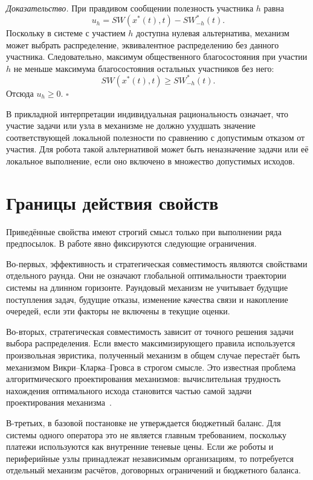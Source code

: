 \textit{Доказательство.}
При правдивом сообщении полезность участника $h$ равна
\[
u_h=SW(x^*(t),t)-SW^*_{-h}(t).
\]
Поскольку в системе с участием $h$ доступна нулевая альтернатива, механизм может выбрать распределение, эквивалентное распределению без данного участника. Следовательно, максимум общественного благосостояния при участии $h$ не меньше максимума благосостояния остальных участников без него:
\[
SW(x^*(t),t)\geq SW^*_{-h}(t).
\]
Отсюда $u_h\geq 0$. \hfill$\square$

В прикладной интерпретации индивидуальная рациональность означает, что участие задачи или узла в механизме не должно ухудшать значение соответствующей локальной полезности по сравнению с допустимым отказом от участия. Для робота такой альтернативой может быть неназначение задачи или её локальное выполнение, если оно включено в множество допустимых исходов.

\section{Границы действия свойств}

Приведённые свойства имеют строгий смысл только при выполнении ряда предпосылок. В работе явно фиксируются следующие ограничения.

Во-первых, эффективность и стратегическая совместимость являются свойствами отдельного раунда. Они не означают глобальной оптимальности траектории системы на длинном горизонте. Раундовый механизм не учитывает будущие поступления задач, будущие отказы, изменение качества связи и накопление очередей, если эти факторы не включены в текущие оценки.

Во-вторых, стратегическая совместимость зависит от точного решения задачи выбора распределения. Если вместо максимизирующего правила используется произвольная эвристика, полученный механизм в общем случае перестаёт быть механизмом Викри--Кларка--Гровса в строгом смысле. Это известная проблема алгоритмического проектирования механизмов: вычислительная трудность нахождения оптимального исхода становится частью самой задачи проектирования механизма~\cite{NisanRonen2001AMD,Nisan2007AlgorithmicGameTheory,NisanRonen2007VCG}.

В-третьих, в базовой постановке не утверждается бюджетный баланс. Для системы одного оператора это не является главным требованием, поскольку платежи используются как внутренние теневые цены. Если же роботы и периферийные узлы принадлежат независимым организациям, то потребуется отдельный механизм расчётов, договорных ограничений и бюджетного баланса.

